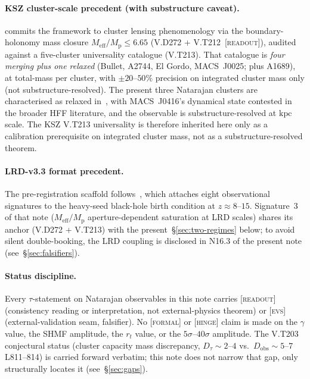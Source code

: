 \documentclass{pantarhei-researchnote}
\newcommand{\Meff}{M_{\mathrm{eff}}}
\newcommand{\Mp}{M_{\mathrm{p}}}                %
\newcommand{\kpc}{\mathrm{kpc}}
\newcommand{\readout}{\textsc{[readout]}}
\newcommand{\evstag}{\textsc{[evs]}}
\newcommand{\falsifierID}[1]{\textsc{N16.#1}}
\begin{document}
\paragraph{KSZ cluster-scale precedent (with substructure caveat).}
\cite{KSZCategorical} commits the framework to cluster lensing
phenomenology via the boundary-holonomy mass closure
$\Meff/\Mp \le 6.65$ (V.D272 + V.T212~\readout), audited against a
five-cluster universality catalogue (V.T213). That catalogue is
\emph{four merging plus one relaxed} (Bullet, A2744, El Gordo,
MACS~J0025; plus A1689), at total-mass per cluster, with $\pm 20$--$50\%$
precision on integrated cluster mass only (not substructure-resolved).
The present three Natarajan clusters are characterised as relaxed
in~\cite{Natarajan2026}, with MACS~J0416's dynamical state contested
in the broader HFF literature, and the observable is substructure-resolved
at $\kpc$ scale. The KSZ V.T213
universality is therefore inherited here only as a calibration prerequisite
on integrated cluster mass, not as a substructure-resolved theorem.

\paragraph{LRD-v3.3 format precedent.}
The pre-registration scaffold follows~\cite{LRDCategoricalv33}, which
attaches eight observational signatures to the heavy-seed black-hole
birth condition at $z \approx 8$--$15$. Signature~3 of that note
($\Meff/\Mp$ aperture-dependent saturation at LRD scales) shares its
anchor (V.D272 + V.T213) with the present~\S\ref{sec:two-regimes} below;
to avoid silent double-booking, the LRD coupling is disclosed in
\falsifierID{3} of the present note (see~\S\ref{sec:falsifiers}).

\paragraph{Status discipline.}
Every $\tau$-statement on Natarajan observables in this note carries
\readout{} (consistency reading or interpretation, not external-physics
theorem) or \evstag{} (external-validation seam, falsifier).
No \textsc{[formal]} or \textsc{[hinge]} claim is made on the
$\gamma$ value, the SHMF amplitude, the $r_t$ value, or the
$5\sigma$--$40\sigma$ amplitude. The V.T203 conjectural status
(cluster capacity mass discrepancy, $D_\tau \sim 2$--$4$ vs.\
$D_{\mathrm{obs}} \sim 5$--$7$~\cite{KSZCategorical} L811--814) is carried
forward verbatim; this note does not narrow that gap, only structurally
locates it (see~\S\ref{sec:gaps}).
\end{document}
